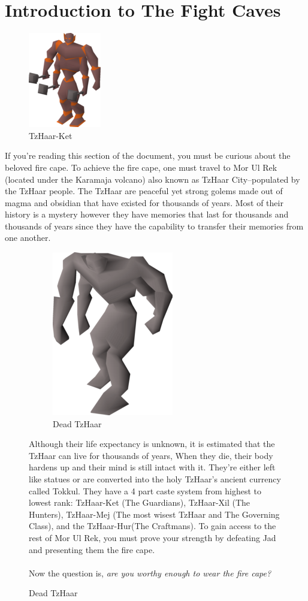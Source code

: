 \documentclass{article}
\newlength\myheight
\newlength\mydepth
\newcommand*\inlinegraphics[1]{%
  \settototalheight\myheight{Xygp}%
  \settodepth\mydepth{Xygp}%
  \raisebox{-\mydepth}{\texttt{[image: \#1]}}%
}
\newcounter{question}
\begin{document}
\section{Introduction to The Fight Caves}
\begin{figure}
\includegraphics[width=.22\textwidth]{tzhaar.png}
\caption*{\small \label{fig:dai}TzHaar-Ket}
\end{figure}
If you're reading this section of the document, you must be curious about the beloved fire cape. To achieve the fire cape, one must travel to Mor Ul Rek (located under the Karamaja volcano) also known as TzHaar City--populated by the TzHaar people. The TzHaar are peaceful  yet strong golems made out of magma and obsidian that have existed for thousands of years. Most of their history is a mystery however they have memories that last for thousands and thousands of years since they have the capability to transfer their memories from one another.
\begin{figure}[h]
\begin{figure}
\includegraphics[width=.21\textwidth]{rock.png}
\caption*{\small \label{fig:dai}Dead TzHaar}
\end{figure}

Although their life expectancy is unknown, it is estimated that the TzHaar can live for thousands of years, When they die, their body hardens up and their mind is still intact with it. They're either left like statues or are converted into the holy TzHaar's ancient currency called Tokkul.\inlinegraphics{tokkul.png} They have a 4 part caste system from highest to lowest rank: TzHaar-Ket (The Guardians), TzHaar-Xil (The Hunters), TzHaar-Mej (The most wisest TzHaar and The Governing Class), and the TzHaar-Hur(The Craftmans). To gain access to the rest of Mor Ul Rek, you must prove your strength by defeating Jad and presenting them the fire cape. \\ 
\\Now the question is, \textit{are you worthy enough to wear the fire cape?}
\end{figure}
\end{document}
